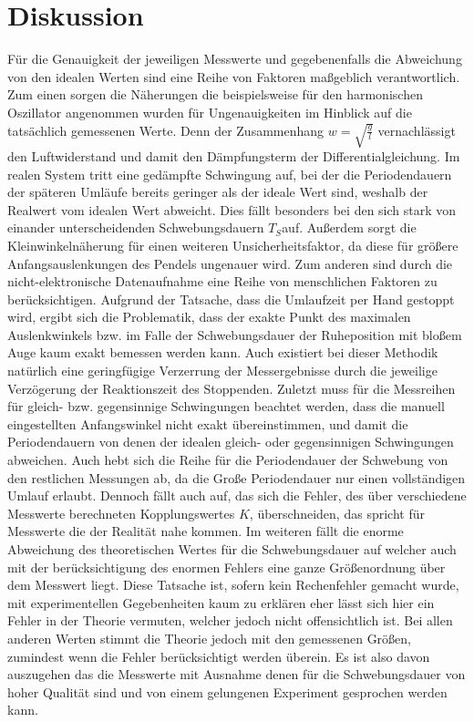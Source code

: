 \section{Diskussion}
\label{sec:diskussion}
Für die Genauigkeit der jeweiligen Messwerte und gegebenenfalls die Abweichung von den idealen Werten 
sind eine Reihe von Faktoren maßgeblich verantwortlich. \newline 
Zum einen sorgen die Näherungen die beispielsweise für den harmonischen Oszillator angenommen wurden für 
Ungenauigkeiten im Hinblick auf die tatsächlich gemessenen Werte. Denn der Zusammenhang 
$w=\sqrt{\frac{g}{l}}$ vernachlässigt den Luftwiderstand und damit den Dämpfungsterm der 
Differentialgleichung. Im realen System tritt eine gedämpfte Schwingung auf, bei der die 
Periodendauern der späteren Umläufe bereits geringer als der ideale Wert sind, weshalb der 
Realwert vom idealen Wert abweicht. Dies fällt besonders bei den sich stark von einander
unterscheidenden Schwebungsdauern $T_S$auf. Außerdem sorgt die Kleinwinkelnäherung für einen weiteren
 Unsicherheitsfaktor, da diese für größere Anfangsauslenkungen des Pendels ungenauer wird. \newline
Zum anderen sind durch die nicht-elektronische Datenaufnahme eine Reihe von menschlichen Faktoren 
zu berücksichtigen. \newline
Aufgrund der Tatsache, dass die Umlaufzeit per Hand gestoppt wird, ergibt sich die Problematik, 
dass der exakte Punkt des maximalen Auslenkwinkels bzw. im Falle der Schwebungsdauer der Ruheposition 
mit bloßem Auge kaum exakt bemessen werden kann. Auch existiert bei dieser Methodik natürlich eine 
geringfügige Verzerrung der Messergebnisse durch die jeweilige Verzögerung der Reaktionszeit des Stoppenden.
 Zuletzt muss für die Messreihen für gleich- bzw. gegensinnige Schwingungen beachtet werden, dass die 
 manuell eingestellten Anfangswinkel nicht exakt übereinstimmen, und damit die Periodendauern von denen der 
 idealen gleich- oder gegensinnigen Schwingungen abweichen. Auch hebt sich die Reihe für die Periodendauer 
 der Schwebung von den restlichen Messungen ab, da die Große Periodendauer nur einen vollständigen Umlauf 
 erlaubt.
 Dennoch fällt auch auf, das sich die Fehler, des über verschiedene Messwerte berechneten
 Kopplungswertes $K$, überschneiden, das spricht für Messwerte die der Realität nahe kommen. 
 Im weiteren fällt die enorme Abweichung des theoretischen Wertes für die Schwebungsdauer auf 
 welcher auch mit der berücksichtigung des enormen Fehlers eine ganze Größenordnung über dem Messwert
 liegt. Diese Tatsache ist, sofern kein Rechenfehler gemacht wurde, mit experimentellen
 Gegebenheiten kaum zu erklären eher lässt sich hier ein Fehler in der Theorie vermuten, welcher jedoch nicht
 offensichtlich ist. Bei allen anderen Werten stimmt die Theorie jedoch mit den gemessenen Größen, zumindest 
 wenn die Fehler berücksichtigt werden überein. Es ist also davon auszugehen das die Messwerte mit Ausnahme denen 
 für die Schwebungsdauer von hoher Qualität sind und von einem gelungenen Experiment gesprochen werden kann.
  
